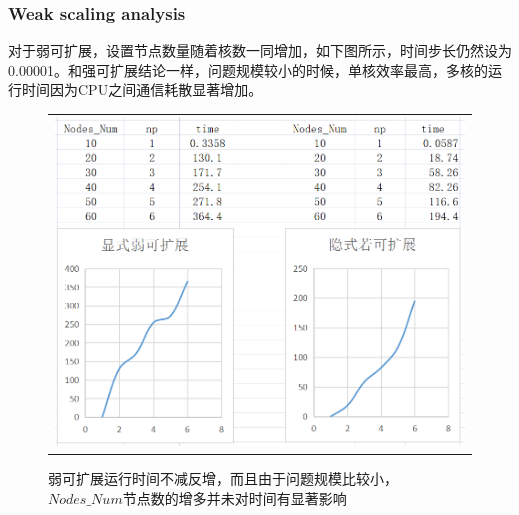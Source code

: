 \documentclass[3p]{elsarticle}
\numberwithin{equation}{section}
\begin{document}
    \subsubsection{Weak scaling analysis}
    对于弱可扩展，设置节点数量随着核数一同增加，如下图所示，时间步长仍然设为0.00001。和强可扩展结论一样，问题规模较小的时候，单核效率最高，多核的运行时间因为CPU之间通信耗散显著增加。
    \begin{figure}[h]
    	\begin{center}
    		\begin{tabular}{c}
    			\includegraphics[angle=0, scale=0.27]{./figures/week.png}
    		\end{tabular}
    	\end{center}
    	\caption{弱可扩展运行时间不减反增，而且由于问题规模比较小，$ Nodes\_Num $节点数的增多并未对时间有显著影响}
    	\label{fig:illustration-week}
    \end{figure}
\end{document}
